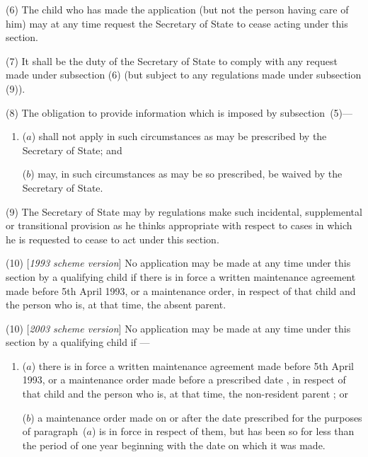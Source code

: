 \documentclass[12pt,a4paper]{article}
\begin{document}
(6) The child who has made the application (but not the person having care of him) may at any time request the Secretary of State to cease acting under this section.

(7) It shall be the duty of the Secretary of State to comply with any request made under subsection (6)  (but subject to any regulations made under subsection (9)).

(8) The obligation to provide information which is imposed by subsection~(5)—
\begin{enumerate}\item[]
($a$) shall not apply in such circumstances as may be prescribed by the Secretary of State; and

($b$) may, in such circumstances as may be so prescribed, be waived by the Secretary of State.
\end{enumerate}

(9) The Secretary of State may by regulations make such incidental, supplemental or transitional provision as he thinks appropriate with respect to cases in which he is requested to cease to act under this section.

(10) [\emph{1993 scheme version}] No application may be made at any time under this section by a qualifying child if there is in force a written maintenance agreement made before 5th April 1993, or a maintenance order, in respect of that child and the person who is, at that time, the absent parent.

(10) [\emph{2003 scheme version}] No application may be made at any time under this section by a qualifying child if%
---
\begin{enumerate}\item[]
($a$) %
 there is in force a written maintenance agreement made before 5th April 1993, or a maintenance order
made before a prescribed date%
, in respect of that child and the person who is, at that time, the 
non-resident parent%
; or

($b$) a maintenance order made on or after the date prescribed for the purposes of paragraph~($a$)  is in force in respect of them, but has been so for less than the period of one year beginning with the date on which it was made.
\end{enumerate}

\end{document}
